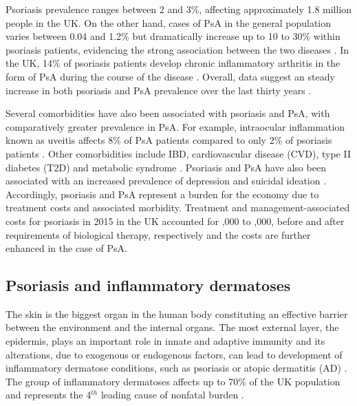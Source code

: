 Psoriasis prevalence ranges between 2 and 3\%, affecting approximately 1.8 million people in the UK\parencite{Perera2012}. On the other hand, cases of PsA in the general population varies between 0.04 and 1.2\% \parencite{Perera2012} but dramatically increase up to 10 to 30\% within psoriasis patients, evidencing the strong association between the two diseases \parencite{Gelfand2005,Reich2008}. In the UK, 14\% of psoriasis patients develop chronic inflammatory arthritis in the form of PsA during the course of the disease \parencite{Ibrahim2009}. Overall, data suggest an steady increase in both psoriasis and PsA prevalence over the last thirty years \parencite{Springate2007,Organization2016}. 

Several comorbidities have also been associated with psoriasis and PsA, with comparatively greater prevalence in PsA. For example, intraocular inflammation known as uveitis affects 8\% of PsA patients compared to only 2\% of psoriasis patients \parencite{Husted2011, Oliveira2015}. Other comorbidities include IBD, cardiovascular disease (CVD), type II diabetes (T2D) and metabolic syndrome \parencite{ Gelfand2006, Shapiro2007,Cohrn20017}. Psoriasis and PsA have also been associated with an increased prevalence of depression and suicidal ideation \parencite{Sampogna2012}. Accordingly, psoriasis and PsA represent a burden for the economy due to treatment costs and associated morbidity. Treatment and management-associated costs for psoriasis in 2015 in the UK accounted for ,000 to ,000, before and after requirements of biological therapy, respectively \parencite{Burgos-Pol2016, Poole2010} and the costs are further enhanced in the case of PsA.





\subsection{Psoriasis and inflammatory dermatoses}
%

The skin is the biggest organ in the human body constituting an effective barrier between the environment and the internal organs. The most external layer, the epidermis, plays an important role in innate and adaptive immunity and its alterations, due to exogenous or endogenous factors, can lead to development of inflammatory dermatose conditions, such as psoriasis or atopic dermatitis (AD) \parencite{Johnson-Huang2009, Proksch2008}. The group of inflammatory dermatoses affects up to 70\% of the UK population and represents the 4$^{th}$ leading cause of nonfatal burden \parencite{ICD-10,Roderick2014}. 

